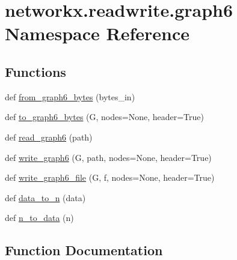 \hypertarget{namespacenetworkx_1_1readwrite_1_1graph6}{}\section{networkx.\+readwrite.\+graph6 Namespace Reference}
\label{namespacenetworkx_1_1readwrite_1_1graph6}
\subsection*{Functions}
\begin{DoxyCompactItemize}
\item 
def \hyperlink{namespacenetworkx_1_1readwrite_1_1graph6_a873694b167fb45a5ce7d65bb07d02efb}{from\+\_\+graph6\+\_\+bytes} (bytes\+\_\+in)
\item 
def \hyperlink{namespacenetworkx_1_1readwrite_1_1graph6_a99cb348e0bac6ccce5f644d97e1ae116}{to\+\_\+graph6\+\_\+bytes} (G, nodes=None, header=True)
\item 
def \hyperlink{namespacenetworkx_1_1readwrite_1_1graph6_a9027ab628428ffc2a9e2896c8308db1b}{read\+\_\+graph6} (path)
\item 
def \hyperlink{namespacenetworkx_1_1readwrite_1_1graph6_a75c8e32d09d505b1a5c5eb4b20bd967d}{write\+\_\+graph6} (G, path, nodes=None, header=True)
\item 
def \hyperlink{namespacenetworkx_1_1readwrite_1_1graph6_a414674908b2f3bd249dcd5bba478e03a}{write\+\_\+graph6\+\_\+file} (G, f, nodes=None, header=True)
\item 
def \hyperlink{namespacenetworkx_1_1readwrite_1_1graph6_af08e019c7aabef68c5b6806348ee117f}{data\+\_\+to\+\_\+n} (data)
\item 
def \hyperlink{namespacenetworkx_1_1readwrite_1_1graph6_a66aa9946351ad26c99d04c4f79beacae}{n\+\_\+to\+\_\+data} (n)
\end{DoxyCompactItemize}


\subsection{Function Documentation}
\mbox{\label{namespacenetworkx_1_1readwrite_1_1graph6_af08e019c7aabef68c5b6806348ee117f}} 
